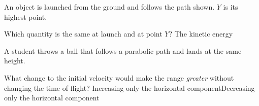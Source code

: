 \begin{quizq}{}
An object is launched from the ground and follows the path shown. $Y$ is its highest point.
\begin{center}
\end{center}
Which quantity is the same at launch and at point $Y$?
  {The kinetic energy}
\end{quizq}

\begin{quizq}{}
A student throws a ball that follows a parabolic path and lands at the same height.

What change to the initial velocity would make the range \emph{greater} without changing the time of
flight?
  {Increasing only the horizontal component}{Decreasing only the horizontal component}
\end{quizq}

